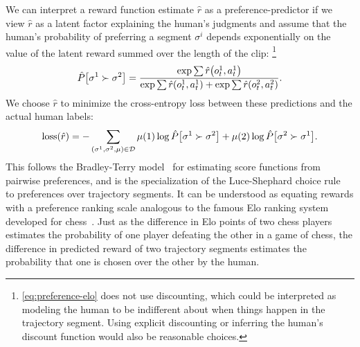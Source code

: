 \documentclass{article}
\def\rest{\hat{r}}  %
\DeclarePairedDelimiter{\bdelims}{[}{]}
\DeclarePairedDelimiter{\pdelims}{(}{)}
\newcommand{\of}[1]{\pdelims*{#1}}
\newcommand{\db}{\mathcal{D}}
\begin{document}
We can interpret a reward function estimate $\rest$ as a preference-predictor
if we view $\rest$ as a latent factor explaining the human's judgments
and assume that the human's probability of preferring a segment $\sigma^i$ depends exponentially
on the value of the latent reward
summed over the length of the clip:%
\footnote{\autoref{eq:preference-elo} does not use discounting,
which could be interpreted as modeling the human to be indifferent about when things happen in the trajectory segment.
Using explicit discounting or inferring the human's discount function would also be reasonable choices.}
\begin{equation}\label{eq:preference-elo}
\hat{P}\bdelims*{\sigma^1 \succ \sigma^2} =
\frac{\exp{\sum \rest\of{o^1_t, a^1_t}}}{\exp{\sum\rest\of{o^1_t, a^1_t}} + \exp{\sum\rest\of{o^2_t, a^2_t}}}.
\end{equation}
We choose $\rest$ to minimize the cross-entropy loss
between these predictions and the actual human labels:
\[
  \mathrm{loss}\of{\rest}
= -\sum_{\of{\sigma^1, \sigma^2, \mu} \in \db} \mu\of{1} \log \hat{P}\bdelims*{\sigma^1 \succ \sigma^2}
                                            + \mu\of{2} \log \hat{P}\bdelims*{\sigma^2 \succ \sigma^1}.
\]
This follows the Bradley-Terry model~\citep{Bradley52} for estimating score functions from pairwise preferences,
and is the specialization of the Luce-Shephard choice rule~\citep{Luce05, Shepard57}
to preferences over trajectory segments.
It can be understood as equating rewards with
a preference ranking scale analogous to
the famous Elo ranking system developed for chess~\citep{Elo78}.
Just as the difference in Elo points of two chess players estimates the probability
of one player defeating the other in a game of chess,
the difference in predicted reward of two trajectory segments estimates the probability
that one is chosen over the other by the human.
\end{document}

